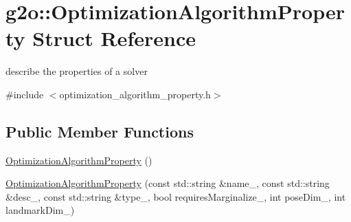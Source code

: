 \hypertarget{structg2o_1_1_optimization_algorithm_property}{}\section{g2o\+:\+:Optimization\+Algorithm\+Property Struct Reference}
\label{structg2o_1_1_optimization_algorithm_property}


describe the properties of a solver  




{\ttfamily \#include $<$optimization\+\_\+algorithm\+\_\+property.\+h$>$}

\subsection*{Public Member Functions}
\begin{DoxyCompactItemize}
\item 
\mbox{\hyperlink{structg2o_1_1_optimization_algorithm_property_a2d83548ee175988e11738ae43c7a9803}{Optimization\+Algorithm\+Property}} ()
\item 
\mbox{\hyperlink{structg2o_1_1_optimization_algorithm_property_a5633cbd029eda42670f801de508f945b}{Optimization\+Algorithm\+Property}} (const std\+::string \&name\+\_\+, const std\+::string \&desc\+\_\+, const std\+::string \&type\+\_\+, bool requires\+Marginalize\+\_\+, int pose\+Dim\+\_\+, int landmark\+Dim\+\_\+)
\end{DoxyCompactItemize}
